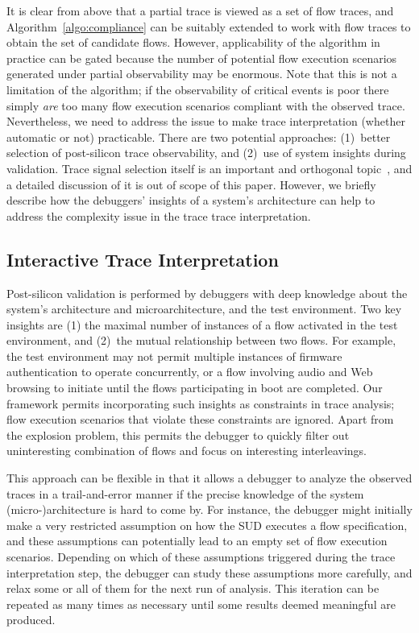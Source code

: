 \documentclass[conference]{IEEEtran}
\begin{document}
It is clear from above that a partial trace is viewed as a
set of flow traces, and Algorithm~\ref{algo:compliance} can
be suitably extended to work with flow traces to obtain the
set of candidate flows.  However, applicability of the
algorithm in practice can be gated because the number of
potential flow execution scenarios generated under partial
observability may be enormous.  Note that this is not a
limitation of the algorithm; if the observability of
critical events is poor there simply {\em are} too many flow
execution scenarios compliant with the observed trace.
Nevertheless, we need to address the issue to make trace
interpretation (whether automatic or not) practicable.
There are two potential approaches: (1)~better selection of
post-silicon trace observability, and (2)~use of system
insights during validation.  Trace signal selection itself
is an important and orthogonal topic~\cite{nicolici,basu},
and a detailed discussion of it is out of scope of this
paper.  However, we briefly describe how the debuggers'
insights of a system's architecture can help to address the
complexity issue in the trace trace interpretation.


\subsection{Interactive Trace Interpretation}

Post-silicon validation is performed by debuggers with deep
knowledge about the system's architecture and
microarchitecture, and the test environment.  Two key
insights are (1) the maximal number of instances of a flow
activated in the test environment, and (2)~the mutual
relationship between two flows.  For example, the test
environment may not permit multiple instances of firmware
authentication to operate concurrently, or a flow involving
audio and Web browsing to initiate until the flows
participating in boot are completed.  Our framework permits
incorporating such insights as constraints in trace
analysis; flow execution scenarios that violate these
constraints are ignored.  Apart from the explosion problem,
this permits the debugger to quickly filter out
uninteresting combination of flows and focus on interesting
interleavings.

This approach can be flexible in that it allows a debugger
to analyze the observed traces in a trail-and-error manner
if the precise knowledge of the system (micro-)architecture
is hard to come by.  For instance, the debugger might
initially make a very restricted assumption on how the SUD
executes a flow specification, and these assumptions can
potentially lead to an empty set of flow execution
scenarios.  Depending on which of these assumptions
triggered during the trace interpretation step, the debugger
can study these assumptions more carefully, and relax some
or all of them for the next run of analysis.  This iteration
can be repeated as many times as necessary until some
results deemed meaningful are produced.
\end{document}
